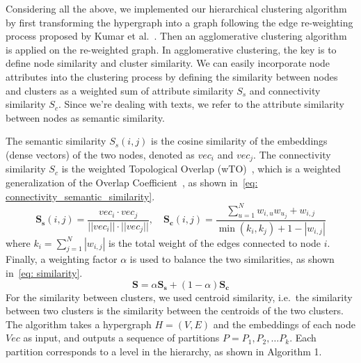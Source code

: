 Considering all the above, we implemented our hierarchical clustering algorithm by first transforming the hypergraph into a graph following the edge re-weighting process proposed by Kumar et al.~\cite{kumar2020new}.
Then an agglomerative clustering algorithm~\cite{steinbach2000doccluster} is applied on the re-weighted graph.
In agglomerative clustering, the key is to define node similarity and cluster similarity.
We can easily incorporate node attributes into the clustering process by defining the similarity between nodes and clusters as a weighted sum of attribute similarity $S_s$ and connectivity similarity $S_c$.
Since we're dealing with texts, we refer to the attribute similarity between nodes as semantic similarity. 

The semantic similarity $S_s(i, j)$ is the cosine similarity of the embeddings (dense vectors) of the two nodes, denoted as $vec_i$ and $vec_j$.
The connectivity similarity $S_c$ is the weighted Topological Overlap (wTO)~\cite{gysi2018wto},
which is a weighted generalization of the Overlap Coefficient~\cite{vijaymeena2016survey}, as shown in~\autoref{eq: connectivity_semantic_similarity}.
\begin{equation}\label{eq: connectivity_semantic_similarity}
    \mathbf{S_s}(i, j) = \frac{vec_i \cdot vec_j}{||vec_i|| \cdot ||vec_j||}, \quad
    \mathbf{S_c}(i, j) = \frac{\sum_{u=1}^N{w_{i,u}w_{u_j}} + w_{i,j}}{\min(k_i, k_j) + 1 - |w_{i,j}|}
\end{equation}
where $k_i = \sum_{j=1}^N |w_{i,j}|$ is the total weight of the edges connected to node $i$.
Finally, a weighting factor $\alpha$ is used to balance the two similarities, as shown in~\autoref{eq: similarity}.
\begin{equation}\label{eq: similarity}
    \mathbf{S} = \alpha \mathbf{S_s} + (1-\alpha) \mathbf{S_c}
\end{equation}
For the similarity between clusters, we used centroid similarity, i.e.\ the similarity between two clusters is the similarity between the centroids of the two clusters.
The algorithm takes a hypergraph $H=(V, E)$ and the embeddings of each node $Vec$ as input, and outputs a sequence of partitions $P=P_1, P_2, \dots P_k$.
Each partition corresponds to a level in the hierarchy, as shown in Algorithm 1.
